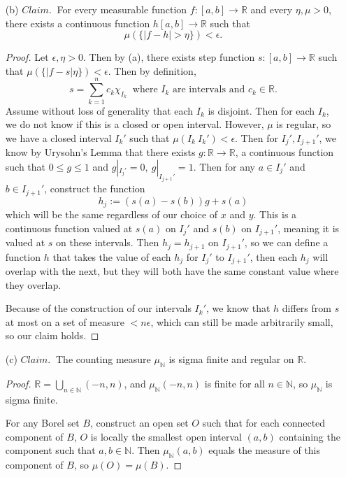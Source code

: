 \documentclass[12pt]{article}
\def\R{\mathbb{R}}
\def\N{\mathbb{N}}
\begin{document}
\begin{itemize}
    \item[(b)] $Claim.~$ For every measurable function $f : [a, b] \to \R$ and every $\eta, \mu > 0$, there exists a continuous function $h [a, b] \to \R$ such that $$\mu( \{|f - h| > \eta \}) < \epsilon.$$
    
    \begin{proof}
        Let $\epsilon, \eta > 0$. Then by (a), there exists step function $s : [a, b] \to \R$ such that $\mu(\{|f - s| \eta\}) < \epsilon.$ Then by definition, $$s = \sum_{k=1}^{n} c_k \chi_{I_k} ~\text{ where } I_k \text{ are intervals and } c_k \in \R.$$ Assume without loss of generality that each $I_k$ is disjoint. Then for each $I_k$, we do not know if this is a closed or open interval. However, $\mu$ is regular, so we have a closed interval $I_k'$ such that $\mu(I_k \ I_k') < \epsilon$. Then for $I_j', I_{j+1}'$, we know by Urysohn's Lemma that there exists $g : \R \to \R$, a continuous function such that $0 \leq g \leq 1$ and $g|_{I_j'} = 0, ~g|_{I_{j+1}'} = 1$. Then for any $a \in I_j'$ and $b \in I_{j+1}'$, construct the function $$h_j := (s(a) - s(b))g + s(a)$$ which will be the same regardless of our choice of $x$ and $y$. This is a continuous function valued at $s(a)$ on $I_j'$ and $s(b)$ on $I_{j+1}'$, meaning it is valued at $s$ on these intervals. Then $h_j = h_{j+1}$ on $I_{j+1}'$, so we can define a function $h$ that takes the value of each $h_j$ for $I_j'$ to $I_{j+1}'$, then each $h_j$ will overlap with the next, but they will both have the same constant value where they overlap.

        Because of the construction of our intervals $I_k'$, we know that $h$ differs from $s$ at most on a set of measure $< n\epsilon$, which can still be made arbitrarily small, so our claim holds.
    \end{proof}

    \item[(c)] $Claim.~$ The counting measure $\mu_\N$ is sigma finite and regular on $\R$.
    
    \begin{proof}
        $\R = \bigcup_{n \in \N} (-n, n)$, and $\mu_\N (-n, n)$ is finite for all $n \in \N$, so $\mu_\N$ is sigma finite.

        For any Borel set $B$, construct an open set $O$ such that for each connected component of $B$, $O$ is locally the smallest open interval $(a, b)$ containing the component such that $a, b \in \N$. Then $\mu_\N (a, b)$ equals the measure of this component of $B$, so $\mu (O) = \mu (B)$.


\end{proof}
\end{itemize}
\end{document}
